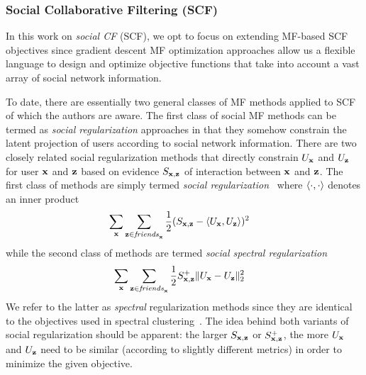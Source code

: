 
\subsubsection{Social Collaborative Filtering (SCF)}
\label{sec:scf_original}

In this work on \emph{social CF} (SCF), we opt to focus on extending
MF-based SCF objectives since gradient descent MF optimization
approaches allow us a flexible language to design and optimize
objective functions that take into account a vast array of social
network information.

To date, there are essentially two general classes of MF methods
applied to SCF of which the authors are aware.  
The first class of social MF methods can be termed as \emph{social
regularization} approaches in that they somehow constrain the latent
projection of users according to social network information.  There
are two closely related social regularization methods that directly
constrain $U_{\mathbf{x}}$ and $U_{\mathbf{z}}$ for user $\mathbf{x}$ and $\mathbf{z}$ based on evidence
$S_{\mathbf{x},\mathbf{z}}$ of interaction between $\mathbf{x}$ and $\mathbf{z}$.  The first class of
methods are simply termed \emph{social
regularization}~\cite{lla,socinf} where $\langle \cdot, \cdot \rangle$ denotes an inner
product
\begin{align}
\sum_{\mathbf{x}} & \sum_{\mathbf{z} \in \mathit{friends}_{\mathbf{x}}} \frac{1}{2} (S_{\mathbf{x},\mathbf{z}} - \langle U_{\mathbf{x}}, U_{\mathbf{z}} \rangle)^2 \label{eq:simple_sr}
\end{align}
while the second class of methods are termed 
\emph{social spectral regularization}~\cite{sr,rrmf}
\begin{align}
\sum_{\mathbf{x}} & \sum_{\mathbf{z} \in \mathit{friends}_{\mathbf{x}}} \frac{1}{2} S^+_{\mathbf{x},\mathbf{z}} \| U_{\mathbf{x}} - U_{\mathbf{z}} \|_2^2 \label{eq:simple_spectral_sr}
\end{align}
We refer to the latter as \emph{spectral} regularization methods since they are
identical to the objectives used in spectral clustering~\cite{spectral}.
The idea behind both variants of social regularization should be apparent:
the larger $S_{\mathbf{x},\mathbf{z}}$ or $S^+_{\mathbf{x},\mathbf{z}}$, the more $U_{\mathbf{x}}$ and $U_{\mathbf{z}}$ need to
be similar (according to slightly different metrics) 
in order to minimize the given objective.

